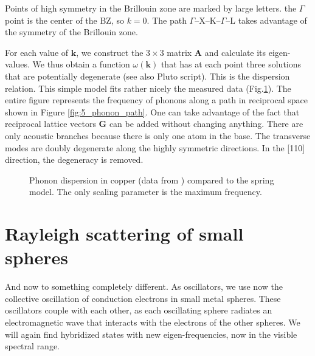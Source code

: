 \begin{marginfigure}
\caption{Points of high symmetry in the Brillouin zone are marked by large letters. the $\Gamma$ point is the center of the BZ, so $k=0$. The path $\Gamma$--X--K--$\Gamma$--L takes advantage of the symmetry of the Brillouin zone. \label{fig:5_phonon_path} }
\end{marginfigure}

For each value of $\mathbf{k}$, we construct the $3 \times 3$ matrix $\mathbf{A}$ and calculate its eigen-values. We thus obtain a function $\omega(\mathbf{k})$ that has at each point three solutions that are  potentially degenerate (see also Pluto script). This is the dispersion relation. This simple model fits rather nicely the measured data (Fig.\ref{fig:5_phonon_copper}). The entire figure represents the frequency of phonons along a path in reciprocal space shown in Figure \ref{fig:5_phonon_path}. One can take advantage of the fact that reciprocal lattice vectors $\mathbf{G}$ can be added without changing anything. There are only acoustic branches because there is only one atom in the base. The transverse modes are doubly degenerate along the highly symmetric directions. In the [110] direction, the degeneracy is removed.
 

\begin{figure}
\caption{Phonon dispersion in copper (data from \cite{Svensson_cu}) compared to the spring model. The only scaling parameter is the maximum frequency. \label{fig:5_phonon_copper}}
\end{figure}



\section{Rayleigh scattering of small spheres}


And now to something completely different. As oscillators, we use now the collective oscillation of conduction electrons in small metal spheres. These oscillators couple with each other, as each oscillating sphere radiates an electromagnetic wave that interacts with the electrons of the other spheres. We will again find hybridized states with new eigen-frequencies, now in the visible spectral range.

